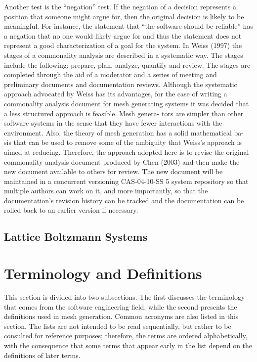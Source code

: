 \documentclass[12pt]{article}
\begin{document}
Another test is the “negation” test. If the negation of a decision represents a position
that someone might argue for, then the original decision is likely to be meaningful. For
instance, the statement that “the software should be reliable” has a negation that no one
would likely argue for and thus the statement does not represent a good characterization
of a goal for the system.
In Weiss (1997) the stages of a commonality analysis are described in a systematic way.
The stages include the following: prepare, plan, analyze, quantify and review. The stages
are completed through the aid of a moderator and a series of meeting and preliminary
documents and documentation reviews. Although the systematic approach advocated by
Weiss has its advantages, for the case of writing a commonality analysis document for mesh
generating systems it was decided that a less structured approach is feasible. Mesh genera-
tors are simpler than other software systems in the sense that they have fewer interactions
with the environment. Also, the theory of mesh generation has a solid mathematical ba-
sis that can be used to remove some of the ambiguity that Weiss’s approach is aimed
at reducing. Therefore, the approach adopted here is to revise the original commonality
analysis document produced by Chen (2003) and then make the new document available
to others for review. The new document will be maintained in a concurrent versioning
CAS-04-10-SS
5
system repository so that multiple authors can work on it, and more importantly, so that
the documentation’s revision history can be tracked and the documentation can be rolled
back to an earlier version if necessary.


\subsection{Lattice Boltzmann Systems}
\newpage
\section{Terminology and Definitions}
This section is divided into two subsections. The first discusses the terminology that comes
from the software engineering field, while the second presents the definitions used in mesh
generation. Common acronyms are also listed in this section. The lists are not intended
to be read sequentially, but rather to be consulted for reference purposes; therefore, the
terms are ordered alphabetically, with the consequence that some terms that appear early
in the list depend on the definitions of later terms.
\end{document}

